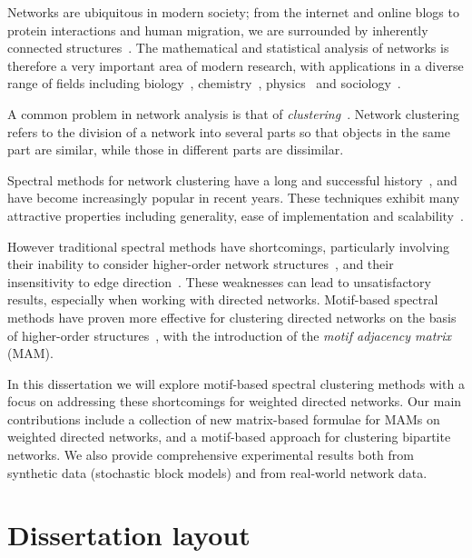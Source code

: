 \documentclass[12pt,draft]{ociamthesis}
\theoremstyle{plain}
\theoremstyle{definition}
\theoremstyle{remark}
\begin{document}
Networks are ubiquitous in modern society; from the internet and online blogs
to protein interactions and human migration, we are surrounded by inherently
connected structures~\cite{kolaczyk2014statistical}.
The mathematical and statistical analysis of networks is therefore a very
important area of modern research, with applications in a diverse range of
fields including biology~\cite{albert2005scale},
chemistry~\cite{jacob2018statistics}, physics~\cite{newman2008physics} and
sociology~\cite{adamic2005political}.

A common problem in network analysis is that of
\emph{clustering}~\cite{schaeffer2007graph}.
Network clustering refers to the division of a network into several parts so
that objects in the same part are similar, while those in different parts are
dissimilar.

Spectral methods for network clustering have a long and successful
history~\cite{cheeger1969lower,donath1972algorithms,guattery1995performance},
and have become increasingly popular in recent years.
These techniques exhibit many attractive properties including generality, ease
of implementation and scalability~\cite{von2007tutorial}.

However traditional spectral methods have shortcomings, particularly involving
their inability to consider higher-order network
structures~\cite{benson2016higher}, and their insensitivity to edge
direction~\cite{DirectedClustImbCuts}. These weaknesses can lead to
unsatisfactory results, especially when working with directed networks.
Motif-based spectral methods have proven more effective for clustering directed
networks on the basis of higher-order
structures~\cite{tsourakakis2017scalable}, with the introduction of the
\emph{motif adjacency matrix} (MAM).

In this dissertation we will explore motif-based spectral clustering methods
with a focus on addressing these shortcomings for weighted directed networks.
Our main contributions include a collection of new matrix-based formulae for
MAMs on weighted directed networks, and a motif-based approach for clustering
bipartite networks. We also provide comprehensive experimental results both
from synthetic data (stochastic block models) and from real-world network data.

\section*{Dissertation layout}
\end{document}
